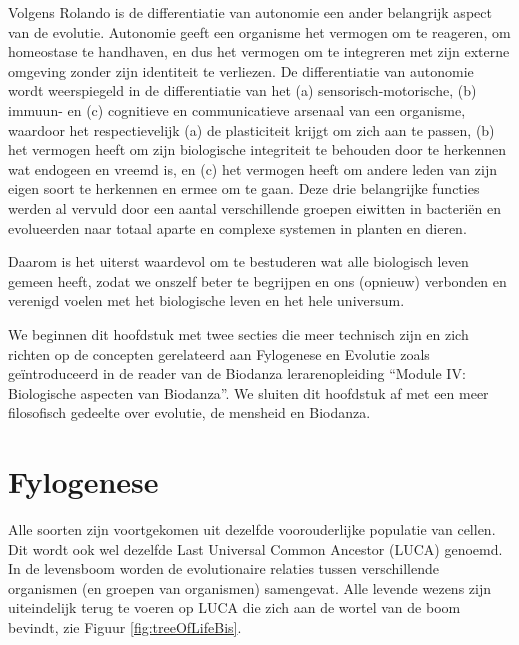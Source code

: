 \documentclass[
  11pt,
]{book}
\begin{document}
Volgens Rolando is de differentiatie van autonomie een ander belangrijk aspect van de evolutie. Autonomie geeft een organisme het vermogen om te reageren, om homeostase te handhaven, en dus het vermogen om te integreren met zijn externe omgeving zonder zijn identiteit te verliezen. De differentiatie van autonomie wordt weerspiegeld in de differentiatie van het (a) sensorisch-motorische, (b) immuun- en (c) cognitieve en communicatieve arsenaal van een organisme, waardoor het respectievelijk (a) de plasticiteit krijgt om zich aan te passen, (b) het vermogen heeft om zijn biologische integriteit te behouden door te herkennen wat endogeen en vreemd is, en (c) het vermogen heeft om andere leden van zijn eigen soort te herkennen en ermee om te gaan. Deze drie belangrijke functies werden al vervuld door een aantal verschillende groepen eiwitten in bacteriën en evolueerden naar totaal aparte en complexe systemen in planten en dieren.

Daarom is het uiterst waardevol om te bestuderen wat alle biologisch leven gemeen heeft, zodat we onszelf beter te begrijpen en ons (opnieuw) verbonden en verenigd voelen met het biologische leven en het hele universum.

We beginnen dit hoofdstuk met twee secties die meer technisch zijn en zich richten op de concepten gerelateerd aan Fylogenese en Evolutie zoals geïntroduceerd in de reader van de Biodanza lerarenopleiding ``Module IV: Biologische aspecten van Biodanza''. We sluiten dit hoofdstuk af met een meer filosofisch gedeelte over evolutie, de mensheid en Biodanza.

\hypertarget{fylogenese}{%
\section{Fylogenese}\label{fylogenese}}

Alle soorten zijn voortgekomen uit dezelfde voorouderlijke populatie van cellen. Dit wordt ook wel dezelfde Last Universal Common Ancestor (LUCA) genoemd. In de levensboom worden de evolutionaire relaties tussen verschillende organismen (en groepen van organismen) samengevat. Alle levende wezens zijn uiteindelijk terug te voeren op LUCA die zich aan de wortel van de boom bevindt, zie Figuur \ref{fig:treeOfLifeBis}.
\end{document}
